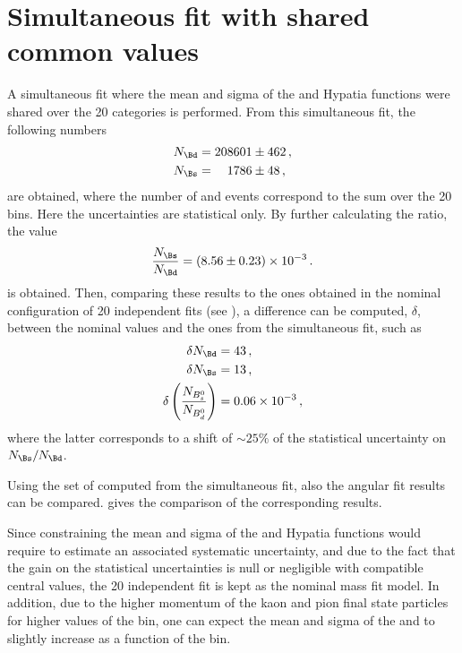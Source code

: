\section{Simultaneous fit with shared common values}\label{app:massFitSimultaneous}
A simultaneous fit where the mean and sigma of the \Bs and \Bd Hypatia functions were shared over the 20 categories is performed. From this simultaneous fit, the following numbers  
\begin{eqnarray}
N_{\Bd} &= 208601 \pm 462 \, ,\\
N_{\Bs} &= \phantom{00} 1786 \pm 48 \, ,
\end{eqnarray}
are obtained, where the number of \Bs and \Bd events correspond to the sum over the 20 bins. Here the uncertainties are statistical only. By further calculating the ratio, the value
\begin{equation}
\frac{N_{\Bs}}{N_{\Bd}} = ( 8.56 \pm 0.23 )\times 10^{-3}\, .
\end{equation}
is obtained. Then, comparing these results to the ones obtained in the nominal configuration of 20 independent fits (see ), a difference can be computed, $\delta$, between the nominal values and the ones from the simultaneous fit, such as 
\begin{align}
\delta N_{\Bd} &= 43 \, ,\\
\delta N_{\Bs} &= 13 \, ,\\
\delta \left(\frac{N_{B^0_s}}{N_{B^0_d}}\right) &=0.06 \times 10^{-3} \, ,
\end{align}
where the latter corresponds to a shift of $\sim25\%$ of the statistical uncertainty on $N_{\Bs}/N_{\Bd}$. 
%

Using the set of \sweights computed from the simultaneous fit, also the angular fit results can be compared.  gives the comparison of the corresponding results. 
%

Since constraining the mean and sigma of the \Bs and \Bd Hypatia functions would require to estimate an associated systematic uncertainty, and due to the fact that the gain on the statistical uncertainties is null or negligible with compatible central values, the 20 independent fit is kept as the nominal mass fit model. In addition, due to the higher momentum of the kaon and pion final state particles for higher values of the \mkpi bin, one can expect the mean and sigma of the \Bs and \Bd to slightly increase as a function of the \mkpi bin. 
%

